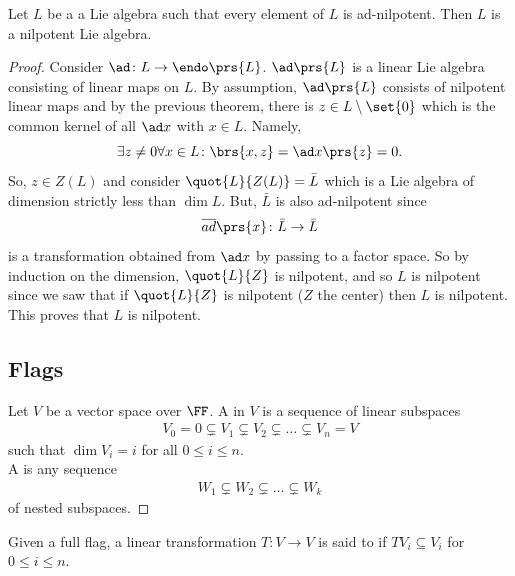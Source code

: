 \documentclass[10pt,a4paper,twoside,openany,hidelinks]{book}
\begin{document}
\begin{theorem}[Engel]
Let $L$ be a a Lie algebra such that every element of $L$ is ad-nilpotent. Then $L$ is a nilpotent Lie algebra.
\end{theorem}
\begin{proof}
Consider $\ad \colon L \to \endo\prs{L}$. $\ad\prs{L}$ is a linear Lie algebra consisting of linear maps on $L$. By assumption, $\ad\prs{L}$ consists of nilpotent linear maps and by the previous theorem, there is $z \in L \setminus \set{0}$ which is the common kernel of all $\ad x$ with $x \in L$. Namely, \[\exists z \neq 0 \forall x \in L \colon \brs{x,z} = \ad x \prs{z} = 0\text{.}\]
So, $z \in Z(L)$ and consider $\quot{L}{Z(L)} = \bar{L}$ which is a Lie algebra of dimension strictly less than $\dim L$. But, $\bar{L}$ is also ad-nilpotent since
\begin{align*}
\overline{ad}\prs{x} \colon \bar{L} \to \bar{L}
\end{align*}
is a transformation obtained from $\ad x$ by passing to a factor space.
So by induction on the dimension, $\quot{L}{Z}$ is nilpotent, and so $L$ is nilpotent since we saw that if $\quot{L}{Z}$ is nilpotent ($Z$ the center) then $L$ is nilpotent.\\
This proves that $L$ is nilpotent.
\subsection{Flags}
Let $V$ be a vector space over $\FF$. A  in $V$ is a sequence of linear subspaces
\begin{align*}
V_0 = 0 \subsetneq V_1 \subsetneq V_2 \subsetneq \ldots \subsetneq V_n = V
\end{align*}
such that $\dim V_i = i$ for all $0 \leq i \leq n$. \\
A  is any sequence
\begin{align*}
W_1 \subsetneq W_2 \subsetneq \ldots \subsetneq W_k
\end{align*}
of nested subspaces.
\end{proof}
\begin{definition}
Given a full flag, a linear transformation $T \colon V \to V$ is said to  if $TV_i \subseteq V_i$ for $0 \leq i \leq n$.
\end{definition}
\end{document}
